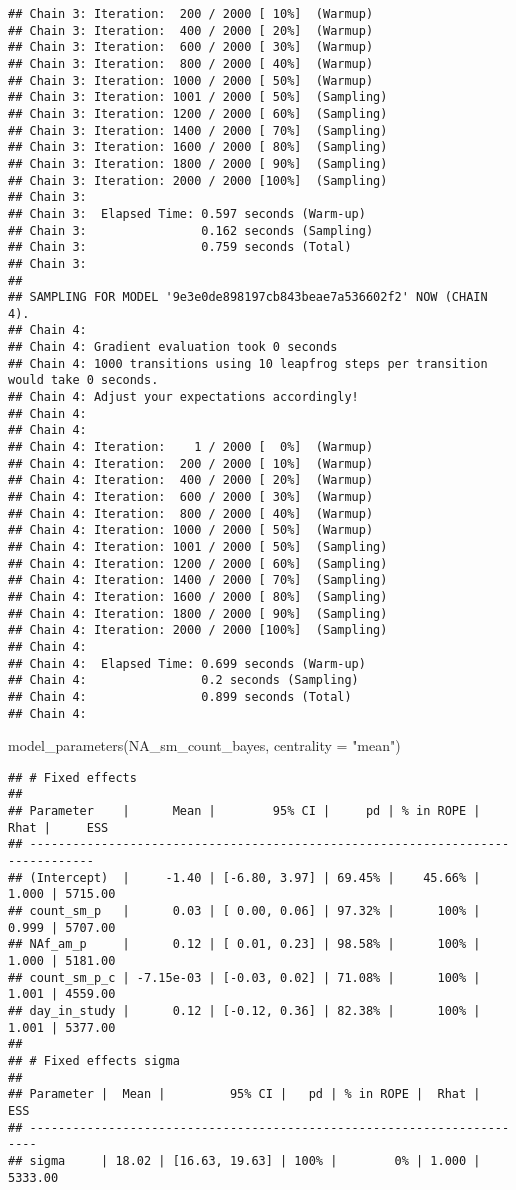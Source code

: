 \documentclass[
]{article}
\newenvironment{Shaded}{\begin{snugshade}}{\end{snugshade}}
\newcommand{\AttributeTok}[1]{\textcolor[rgb]{0.77,0.63,0.00}{#1}}
\newcommand{\FunctionTok}[1]{\textcolor[rgb]{0.00,0.00,0.00}{#1}}
\newcommand{\NormalTok}[1]{#1}
\newcommand{\StringTok}[1]{\textcolor[rgb]{0.31,0.60,0.02}{#1}}
\begin{document}
\begin{verbatim}
## Chain 3: Iteration:  200 / 2000 [ 10%]  (Warmup)
## Chain 3: Iteration:  400 / 2000 [ 20%]  (Warmup)
## Chain 3: Iteration:  600 / 2000 [ 30%]  (Warmup)
## Chain 3: Iteration:  800 / 2000 [ 40%]  (Warmup)
## Chain 3: Iteration: 1000 / 2000 [ 50%]  (Warmup)
## Chain 3: Iteration: 1001 / 2000 [ 50%]  (Sampling)
## Chain 3: Iteration: 1200 / 2000 [ 60%]  (Sampling)
## Chain 3: Iteration: 1400 / 2000 [ 70%]  (Sampling)
## Chain 3: Iteration: 1600 / 2000 [ 80%]  (Sampling)
## Chain 3: Iteration: 1800 / 2000 [ 90%]  (Sampling)
## Chain 3: Iteration: 2000 / 2000 [100%]  (Sampling)
## Chain 3: 
## Chain 3:  Elapsed Time: 0.597 seconds (Warm-up)
## Chain 3:                0.162 seconds (Sampling)
## Chain 3:                0.759 seconds (Total)
## Chain 3: 
## 
## SAMPLING FOR MODEL '9e3e0de898197cb843beae7a536602f2' NOW (CHAIN 4).
## Chain 4: 
## Chain 4: Gradient evaluation took 0 seconds
## Chain 4: 1000 transitions using 10 leapfrog steps per transition would take 0 seconds.
## Chain 4: Adjust your expectations accordingly!
## Chain 4: 
## Chain 4: 
## Chain 4: Iteration:    1 / 2000 [  0%]  (Warmup)
## Chain 4: Iteration:  200 / 2000 [ 10%]  (Warmup)
## Chain 4: Iteration:  400 / 2000 [ 20%]  (Warmup)
## Chain 4: Iteration:  600 / 2000 [ 30%]  (Warmup)
## Chain 4: Iteration:  800 / 2000 [ 40%]  (Warmup)
## Chain 4: Iteration: 1000 / 2000 [ 50%]  (Warmup)
## Chain 4: Iteration: 1001 / 2000 [ 50%]  (Sampling)
## Chain 4: Iteration: 1200 / 2000 [ 60%]  (Sampling)
## Chain 4: Iteration: 1400 / 2000 [ 70%]  (Sampling)
## Chain 4: Iteration: 1600 / 2000 [ 80%]  (Sampling)
## Chain 4: Iteration: 1800 / 2000 [ 90%]  (Sampling)
## Chain 4: Iteration: 2000 / 2000 [100%]  (Sampling)
## Chain 4: 
## Chain 4:  Elapsed Time: 0.699 seconds (Warm-up)
## Chain 4:                0.2 seconds (Sampling)
## Chain 4:                0.899 seconds (Total)
## Chain 4:
\end{verbatim}

\begin{Shaded}
\begin{Highlighting}[]
\FunctionTok{model\_parameters}\NormalTok{(NA\_sm\_count\_bayes, }\AttributeTok{centrality =} \StringTok{"mean"}\NormalTok{)}
\end{Highlighting}
\end{Shaded}

\begin{verbatim}
## # Fixed effects
## 
## Parameter    |      Mean |        95% CI |     pd | % in ROPE |  Rhat |     ESS
## -------------------------------------------------------------------------------
## (Intercept)  |     -1.40 | [-6.80, 3.97] | 69.45% |    45.66% | 1.000 | 5715.00
## count_sm_p   |      0.03 | [ 0.00, 0.06] | 97.32% |      100% | 0.999 | 5707.00
## NAf_am_p     |      0.12 | [ 0.01, 0.23] | 98.58% |      100% | 1.000 | 5181.00
## count_sm_p_c | -7.15e-03 | [-0.03, 0.02] | 71.08% |      100% | 1.001 | 4559.00
## day_in_study |      0.12 | [-0.12, 0.36] | 82.38% |      100% | 1.001 | 5377.00
## 
## # Fixed effects sigma
## 
## Parameter |  Mean |         95% CI |   pd | % in ROPE |  Rhat |     ESS
## -----------------------------------------------------------------------
## sigma     | 18.02 | [16.63, 19.63] | 100% |        0% | 1.000 | 5333.00
\end{verbatim}
\end{document}
